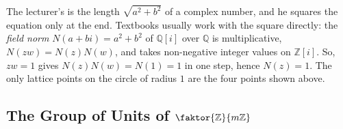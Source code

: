 \begin{content}
\begin{center}
\end{center}

\end{content}

\begin{aiNote}
The lecturer's  is the length $\sqrt{a^2 + b^2}$ of a complex number, and he squares the equation only at the end. Textbooks usually work with the square directly: the \emph{field norm} $N(a + bi) = a^2 + b^2$ of $\mathbb{Q}[i]$ over $\mathbb{Q}$ is multiplicative, $N(zw) = N(z) N(w)$, and takes non-negative integer values on $\mathbb{Z}[i]$. So, $zw = 1$ gives $N(z) N(w) = N(1) = 1$ in one step, hence $N(z) = 1$. The only lattice points on the circle of radius $1$ are the four points shown above.
\end{aiNote}

\subsection{The Group of Units of \texorpdfstring{$\faktor{\mathbb{Z}}{m\mathbb{Z}}$}{Z/mZ}}

